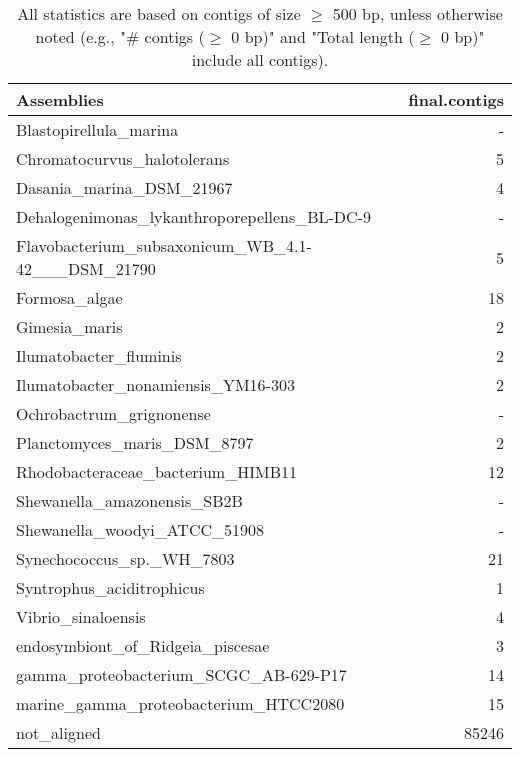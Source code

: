 \documentclass[12pt,a4paper]{article}
\begin{document}
\begin{table}[ht]
\begin{center}
\caption{All statistics are based on contigs of size $\geq$ 500 bp, unless otherwise noted (e.g., "\# contigs ($\geq$ 0 bp)" and "Total length ($\geq$ 0 bp)" include all contigs).}
\begin{tabular}{|l*{1}{|r}|}
\hline
Assemblies & final.contigs \\ \hline
Blastopirellula\_marina & - \\ \hline
Chromatocurvus\_halotolerans & 5 \\ \hline
Dasania\_marina\_DSM\_21967 & 4 \\ \hline
Dehalogenimonas\_lykanthroporepellens\_BL-DC-9 & - \\ \hline
Flavobacterium\_subsaxonicum\_WB\_4.1-42\_\_\_DSM\_21790 & 5 \\ \hline
Formosa\_algae & 18 \\ \hline
Gimesia\_maris & 2 \\ \hline
Ilumatobacter\_fluminis & 2 \\ \hline
Ilumatobacter\_nonamiensis\_YM16-303 & 2 \\ \hline
Ochrobactrum\_grignonense & - \\ \hline
Planctomyces\_maris\_DSM\_8797 & 2 \\ \hline
Rhodobacteraceae\_bacterium\_HIMB11 & 12 \\ \hline
Shewanella\_amazonensis\_SB2B & - \\ \hline
Shewanella\_woodyi\_ATCC\_51908 & - \\ \hline
Synechococcus\_sp.\_WH\_7803 & 21 \\ \hline
Syntrophus\_aciditrophicus & 1 \\ \hline
Vibrio\_sinaloensis & 4 \\ \hline
endosymbiont\_of\_Ridgeia\_piscesae & 3 \\ \hline
gamma\_proteobacterium\_SCGC\_AB-629-P17 & 14 \\ \hline
marine\_gamma\_proteobacterium\_HTCC2080 & 15 \\ \hline
not\_aligned & 85246 \\ \hline
\end{tabular}
\end{center}
\end{table}
\end{document}
